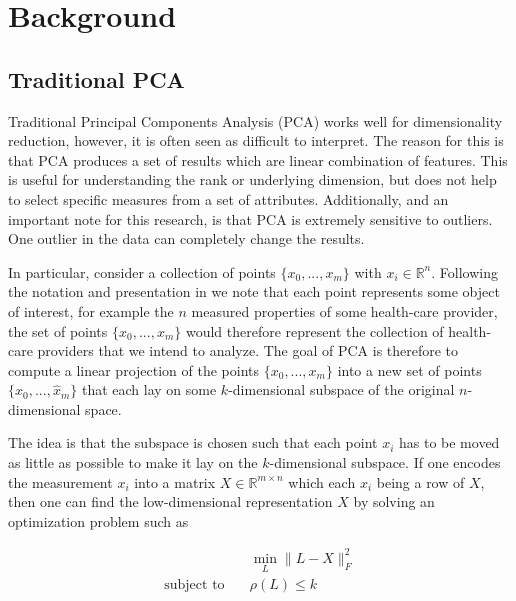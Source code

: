 \documentclass[conference]{IEEEtran}
\begin{document}
\section{Background}
\subsection{Traditional PCA}
Traditional Principal Components Analysis (PCA) works well for dimensionality reduction, however, it is often seen as difficult to interpret.  The reason for this is that PCA produces a set of results which are linear combination of features.  This is useful for understanding the rank or underlying dimension, but does not help to select specific measures from a set of attributes. Additionally, and an important note for this research, is that PCA is extremely sensitive to outliers.  One outlier in the data can completely change the results.

In particular, consider a collection of
points $\{x_0,...,x_m\}$ with $x_i \in \mathbb{R}^n$.  Following the notation and presentation in \cite{paffenroth2018robust} we note that each point represents some object of interest, for example the $n$ measured properties of some health-care provider, the set of points $\{x_0,...,x_m\}$ would therefore
represent the collection of health-care providers that we intend to analyze.
The goal of PCA is therefore to compute a linear projection of the points $\{x_0,...,x_m\}$ into a new
set of points $\{\hat{x}_0,...,\hat{x}_m\}$ that each lay on some $k$-dimensional subspace of the original
$n$-dimensional space.  

The idea is that the subspace is chosen such that each point $x_i$ has to be moved as little as possible
to make it lay on the $k$-dimensional subspace.  If one encodes the measurement $x_i$ into a matrix
$X \in \mathbb{R}^{m \times n}$ which each $x_i$ being a row of $X$, then one can find
the low-dimensional representation $X$ by solving an optimization problem such as 

\begin{align} \label{PCAopt}
  &\min_{L} \| L-X \|_F^2 \\ \nonumber
  \text{subject to}\quad & \rho(L) \le k
\end{align}
\end{document}
